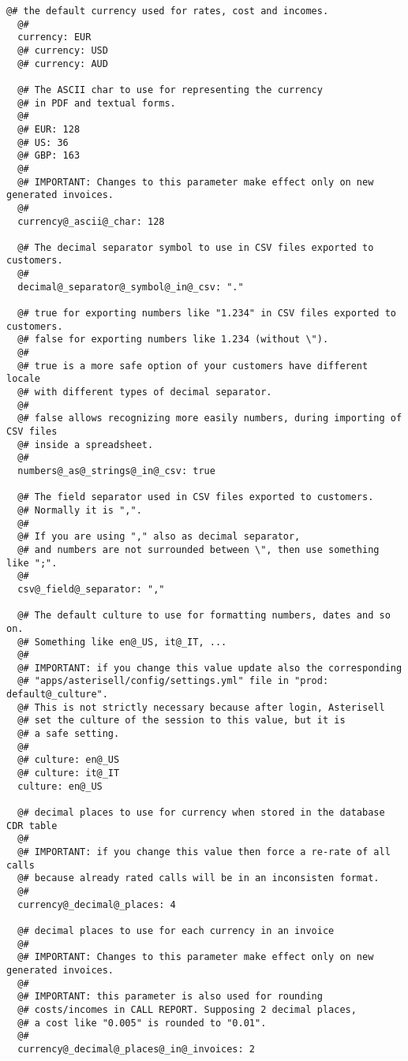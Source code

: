 \documentclass[letterpaper,10pt,english]{sphinxmanual}
\begin{document}
\begin{Verbatim}[commandchars=@\[\]]
  @# the default currency used for rates, cost and incomes.
  @#
  currency: EUR
  @# currency: USD
  @# currency: AUD

  @# The ASCII char to use for representing the currency
  @# in PDF and textual forms.
  @#
  @# EUR: 128
  @# US: 36
  @# GBP: 163
  @# 
  @# IMPORTANT: Changes to this parameter make effect only on new generated invoices.
  @#
  currency@_ascii@_char: 128

  @# The decimal separator symbol to use in CSV files exported to customers.
  @#
  decimal@_separator@_symbol@_in@_csv: "."

  @# true for exporting numbers like "1.234" in CSV files exported to customers.
  @# false for exporting numbers like 1.234 (without \").
  @#
  @# true is a more safe option of your customers have different locale 
  @# with different types of decimal separator.
  @#
  @# false allows recognizing more easily numbers, during importing of CSV files
  @# inside a spreadsheet.
  @#
  numbers@_as@_strings@_in@_csv: true

  @# The field separator used in CSV files exported to customers.
  @# Normally it is ",".
  @#
  @# If you are using "," also as decimal separator, 
  @# and numbers are not surrounded between \", then use something like ";".
  @#
  csv@_field@_separator: ","

  @# The default culture to use for formatting numbers, dates and so on.
  @# Something like en@_US, it@_IT, ...
  @#
  @# IMPORTANT: if you change this value update also the corresponding
  @# "apps/asterisell/config/settings.yml" file in "prod: default@_culture".
  @# This is not strictly necessary because after login, Asterisell
  @# set the culture of the session to this value, but it is 
  @# a safe setting.
  @#
  @# culture: en@_US
  @# culture: it@_IT
  culture: en@_US

  @# decimal places to use for currency when stored in the database CDR table
  @#
  @# IMPORTANT: if you change this value then force a re-rate of all calls
  @# because already rated calls will be in an inconsisten format.
  @#
  currency@_decimal@_places: 4

  @# decimal places to use for each currency in an invoice
  @#
  @# IMPORTANT: Changes to this parameter make effect only on new generated invoices.
  @#
  @# IMPORTANT: this parameter is also used for rounding
  @# costs/incomes in CALL REPORT. Supposing 2 decimal places,
  @# a cost like "0.005" is rounded to "0.01".
  @# 
  currency@_decimal@_places@_in@_invoices: 2


\end{Verbatim}
\end{document}
